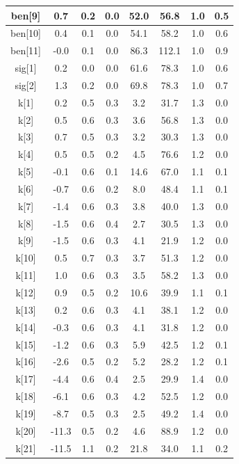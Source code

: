 \begin{longtable}{|c|c|c|c|c|c|c|c|}
\hline
ben[9] & 0.7 & 0.2 & 0.0 & 52.0 & 56.8 & 1.0 & 0.5 \\
\hline
ben[10] & 0.4 & 0.1 & 0.0 & 54.1 & 58.2 & 1.0 & 0.6 \\
\hline
ben[11] & -0.0 & 0.1 & 0.0 & 86.3 & 112.1 & 1.0 & 0.9 \\
\hline
sig[1] & 0.2 & 0.0 & 0.0 & 61.6 & 78.3 & 1.0 & 0.6 \\
\hline
sig[2] & 1.3 & 0.2 & 0.0 & 69.8 & 78.3 & 1.0 & 0.7 \\
\hline
k[1] & 0.2 & 0.5 & 0.3 & 3.2 & 31.7 & 1.3 & 0.0 \\
\hline
k[2] & 0.5 & 0.6 & 0.3 & 3.6 & 56.8 & 1.3 & 0.0 \\
\hline
k[3] & 0.7 & 0.5 & 0.3 & 3.2 & 30.3 & 1.3 & 0.0 \\
\hline
k[4] & 0.5 & 0.5 & 0.2 & 4.5 & 76.6 & 1.2 & 0.0 \\
\hline
k[5] & -0.1 & 0.6 & 0.1 & 14.6 & 67.0 & 1.1 & 0.1 \\
\hline
k[6] & -0.7 & 0.6 & 0.2 & 8.0 & 48.4 & 1.1 & 0.1 \\
\hline
k[7] & -1.4 & 0.6 & 0.3 & 3.8 & 40.0 & 1.3 & 0.0 \\
\hline
k[8] & -1.5 & 0.6 & 0.4 & 2.7 & 30.5 & 1.3 & 0.0 \\
\hline
k[9] & -1.5 & 0.6 & 0.3 & 4.1 & 21.9 & 1.2 & 0.0 \\
\hline
k[10] & 0.5 & 0.7 & 0.3 & 3.7 & 51.3 & 1.2 & 0.0 \\
\hline
k[11] & 1.0 & 0.6 & 0.3 & 3.5 & 58.2 & 1.3 & 0.0 \\
\hline
k[12] & 0.9 & 0.5 & 0.2 & 10.6 & 39.9 & 1.1 & 0.1 \\
\hline
k[13] & 0.2 & 0.6 & 0.3 & 4.1 & 38.1 & 1.2 & 0.0 \\
\hline
k[14] & -0.3 & 0.6 & 0.3 & 4.1 & 31.8 & 1.2 & 0.0 \\
\hline
k[15] & -1.2 & 0.6 & 0.3 & 5.9 & 42.5 & 1.2 & 0.1 \\
\hline
k[16] & -2.6 & 0.5 & 0.2 & 5.2 & 28.2 & 1.2 & 0.1 \\
\hline
k[17] & -4.4 & 0.6 & 0.4 & 2.5 & 29.9 & 1.4 & 0.0 \\
\hline
k[18] & -6.1 & 0.6 & 0.3 & 4.2 & 52.5 & 1.2 & 0.0 \\
\hline
k[19] & -8.7 & 0.5 & 0.3 & 2.5 & 49.2 & 1.4 & 0.0 \\
\hline
k[20] & -11.3 & 0.5 & 0.2 & 4.6 & 88.9 & 1.2 & 0.0 \\
\hline
k[21] & -11.5 & 1.1 & 0.2 & 21.8 & 34.0 & 1.1 & 0.2 \\
\hline

\end{longtable}
